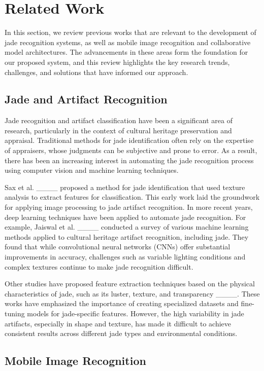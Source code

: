 \section{Related Work}
In this section, we review previous works that are relevant to the development of jade recognition systems, as well as mobile image recognition and collaborative model architectures. The advancements in these areas form the foundation for our proposed system, and this review highlights the key research trends, challenges, and solutions that have informed our approach.

\subsection{Jade and Artifact Recognition}

Jade recognition and artifact classification have been a significant area of research, particularly in the context of cultural heritage preservation and appraisal. Traditional methods for jade identification often rely on the expertise of appraisers, whose judgments can be subjective and prone to error. As a result, there has been an increasing interest in automating the jade recognition process using computer vision and machine learning techniques.

Sax et al. ____ proposed a method for jade identification that used texture analysis to extract features for classification. This early work laid the groundwork for applying image processing to jade artifact recognition. In more recent years, deep learning techniques have been applied to automate jade recognition. For example, Jaiswal et al. ____ conducted a survey of various machine learning methods applied to cultural heritage artifact recognition, including jade. They found that while convolutional neural networks (CNNs) offer substantial improvements in accuracy, challenges such as variable lighting conditions and complex textures continue to make jade recognition difficult.

Other studies have proposed feature extraction techniques based on the physical characteristics of jade, such as its luster, texture, and transparency ____. These works have emphasized the importance of creating specialized datasets and fine-tuning models for jade-specific features. However, the high variability in jade artifacts, especially in shape and texture, has made it difficult to achieve consistent results across different jade types and environmental conditions.

\subsection{Mobile Image Recognition}

